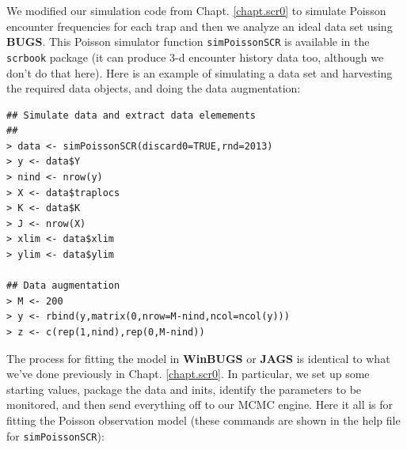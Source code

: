 We modified our simulation code from Chapt. \ref{chapt.scr0} to
simulate Poisson encounter frequencies for each trap and then we
analyze an ideal data set using {\bf BUGS}. This Poisson simulator
function {\tt simPoissonSCR} is available in the \mbox{\tt scrbook}
package (it can produce 3-d encounter history data too, although we
don't do that here).  Here is an example of simulating a data set and
harvesting the required data objects, and doing the data augmentation:
{\small
\begin{verbatim}
## Simulate data and extract data elemements
##
> data <- simPoissonSCR(discard0=TRUE,rnd=2013)
> y <- data$Y
> nind <- nrow(y)
> X <- data$traplocs
> K <- data$K
> J <- nrow(X)
> xlim <- data$xlim
> ylim <- data$ylim

## Data augmentation
> M <- 200
> y <- rbind(y,matrix(0,nrow=M-nind,ncol=ncol(y)))
> z <- c(rep(1,nind),rep(0,M-nind))
\end{verbatim}
}


The process for fitting
the model in {\bf WinBUGS} or {\bf JAGS} is identical to what we've done
previously in Chapt. \ref{chapt.scr0}. In particular, we set up some
starting values, package the data and inits, identify the parameters
to be monitored, and then send everything off to our MCMC engine. Here
it all is for fitting the Poisson observation model (these commands
are shown in the help file for \mbox{\tt simPoissonSCR}):

